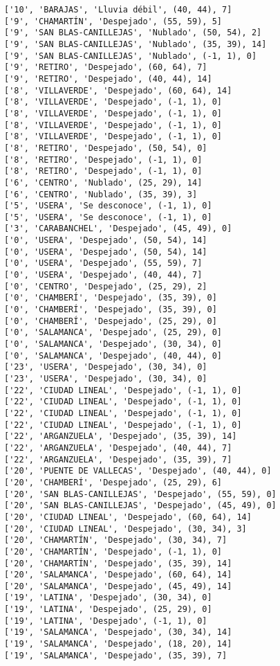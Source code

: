 \documentclass[11pt]{article}
\begin{document}
\begin{Verbatim}[commandchars=\\\{\}]
['10', 'BARAJAS', 'Lluvia débil', (40, 44), 7]
['9', 'CHAMARTÍN', 'Despejado', (55, 59), 5]
['9', 'SAN BLAS-CANILLEJAS', 'Nublado', (50, 54), 2]
['9', 'SAN BLAS-CANILLEJAS', 'Nublado', (35, 39), 14]
['9', 'SAN BLAS-CANILLEJAS', 'Nublado', (-1, 1), 0]
['9', 'RETIRO', 'Despejado', (60, 64), 7]
['9', 'RETIRO', 'Despejado', (40, 44), 14]
['8', 'VILLAVERDE', 'Despejado', (60, 64), 14]
['8', 'VILLAVERDE', 'Despejado', (-1, 1), 0]
['8', 'VILLAVERDE', 'Despejado', (-1, 1), 0]
['8', 'VILLAVERDE', 'Despejado', (-1, 1), 0]
['8', 'VILLAVERDE', 'Despejado', (-1, 1), 0]
['8', 'RETIRO', 'Despejado', (50, 54), 0]
['8', 'RETIRO', 'Despejado', (-1, 1), 0]
['8', 'RETIRO', 'Despejado', (-1, 1), 0]
['6', 'CENTRO', 'Nublado', (25, 29), 14]
['6', 'CENTRO', 'Nublado', (35, 39), 3]
['5', 'USERA', 'Se desconoce', (-1, 1), 0]
['5', 'USERA', 'Se desconoce', (-1, 1), 0]
['3', 'CARABANCHEL', 'Despejado', (45, 49), 0]
['0', 'USERA', 'Despejado', (50, 54), 14]
['0', 'USERA', 'Despejado', (50, 54), 14]
['0', 'USERA', 'Despejado', (55, 59), 7]
['0', 'USERA', 'Despejado', (40, 44), 7]
['0', 'CENTRO', 'Despejado', (25, 29), 2]
['0', 'CHAMBERÍ', 'Despejado', (35, 39), 0]
['0', 'CHAMBERÍ', 'Despejado', (35, 39), 0]
['0', 'CHAMBERÍ', 'Despejado', (25, 29), 0]
['0', 'SALAMANCA', 'Despejado', (25, 29), 0]
['0', 'SALAMANCA', 'Despejado', (30, 34), 0]
['0', 'SALAMANCA', 'Despejado', (40, 44), 0]
['23', 'USERA', 'Despejado', (30, 34), 0]
['23', 'USERA', 'Despejado', (30, 34), 0]
['22', 'CIUDAD LINEAL', 'Despejado', (-1, 1), 0]
['22', 'CIUDAD LINEAL', 'Despejado', (-1, 1), 0]
['22', 'CIUDAD LINEAL', 'Despejado', (-1, 1), 0]
['22', 'CIUDAD LINEAL', 'Despejado', (-1, 1), 0]
['22', 'ARGANZUELA', 'Despejado', (35, 39), 14]
['22', 'ARGANZUELA', 'Despejado', (40, 44), 7]
['22', 'ARGANZUELA', 'Despejado', (35, 39), 7]
['20', 'PUENTE DE VALLECAS', 'Despejado', (40, 44), 0]
['20', 'CHAMBERÍ', 'Despejado', (25, 29), 6]
['20', 'SAN BLAS-CANILLEJAS', 'Despejado', (55, 59), 0]
['20', 'SAN BLAS-CANILLEJAS', 'Despejado', (45, 49), 0]
['20', 'CIUDAD LINEAL', 'Despejado', (60, 64), 14]
['20', 'CIUDAD LINEAL', 'Despejado', (30, 34), 3]
['20', 'CHAMARTÍN', 'Despejado', (30, 34), 7]
['20', 'CHAMARTÍN', 'Despejado', (-1, 1), 0]
['20', 'CHAMARTÍN', 'Despejado', (35, 39), 14]
['20', 'SALAMANCA', 'Despejado', (60, 64), 14]
['20', 'SALAMANCA', 'Despejado', (45, 49), 14]
['19', 'LATINA', 'Despejado', (30, 34), 0]
['19', 'LATINA', 'Despejado', (25, 29), 0]
['19', 'LATINA', 'Despejado', (-1, 1), 0]
['19', 'SALAMANCA', 'Despejado', (30, 34), 14]
['19', 'SALAMANCA', 'Despejado', (18, 20), 14]
['19', 'SALAMANCA', 'Despejado', (35, 39), 7]

\end{Verbatim}
\end{document}
